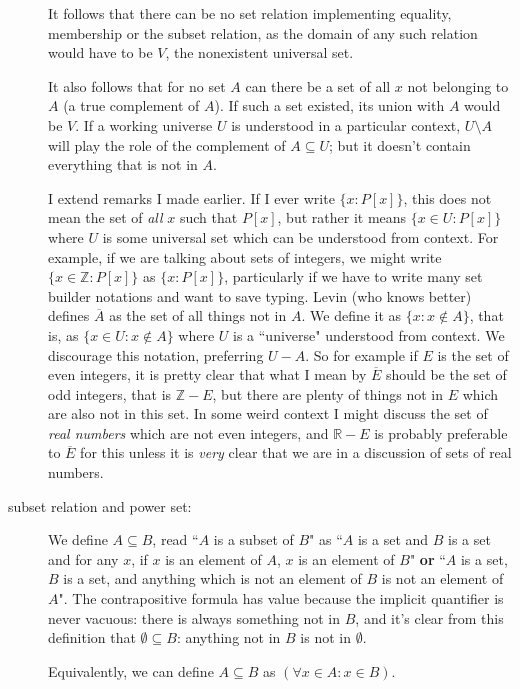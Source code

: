 \documentclass[12pt]{article}
\begin{document}
\begin{description}
It follows that there can be no set relation implementing equality, membership or the subset relation, as the domain of any such relation would have to be $V$, the nonexistent universal set.

It also follows that for no set $A$ can there be a set of all $x$ not belonging to $A$ (a true complement of $A$).
If such a set existed, its union with $A$ would be $V$.  If a working universe $U$ is understood in a particular context,
$U \setminus A$ will play the role of the complement of $A \subseteq U$;  but it doesn't contain everything that is not in $A$.


I extend remarks I made earlier.  If I ever write $\{x:P[x]\}$, this does not mean the set of {\em all\/} $x$ such that $P[x]$, but rather it means $\{x\in U:P[x]\}$  where $U$ is some universal set which can be understood from context.  For example, if we are talking about sets of integers, we might write $\{x\in \mathbb Z:P[x]\}$ as $\{x:P[x]\}$, particularly if we have to write many set builder notations and want to save typing.
Levin (who knows better) defines $\overline{A}$ as the set of all things not in $A$.  We define it as $\{x:x \not\in A\}$, that is, as $\{x\in U:x \not\in A\}$ where $U$ is a ``universe" understood from context.
We discourage this notation, preferring $U - A$.  So for example if $E$ is the set of even integers, it is pretty clear that what I mean by $\overline{E}$ should be the set of odd integers, that is $\mathbb Z - E$, but there are plenty of things not in $E$ which are also not in this set.  In some weird context I might discuss the set of {\em real numbers\/} which are not even integers, and $\mathbb R - E$ is probably preferable to $\overline{E}$ for this unless it is {\em very\/} clear that we are in a discussion of sets of real numbers.


\item[subset relation and power set:]  We define $A \subseteq B$, read ``$A$ is a subset of $B$" as  ``$A$ is a set and $B$ is a set and for any $x$, if $x$ is an element of $A$, $x$ is an element of $B$" {\bf or}  ``$A$ is a set, $B$ is a set, and anything which is not an element of $B$ is not an element of $A$".  The contrapositive formula has value because the implicit quantifier is never vacuous:  there is always something not in $B$, and it's clear from this definition that $\emptyset \subseteq B$:  anything not in $B$ is not in $\emptyset$.

Equivalently, we can define $A \subseteq B$ as $(\forall x \in A: x\in B)$.


\end{description}
\end{document}
